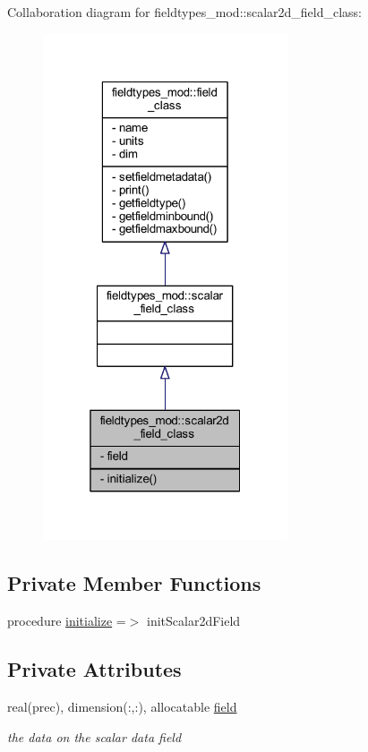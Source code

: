 Collaboration diagram for fieldtypes\+\_\+mod\+:\+:scalar2d\+\_\+field\+\_\+class\+:\nopagebreak
\begin{figure}[H]
\begin{center}
\leavevmode
\includegraphics[width=205pt]{structfieldtypes__mod_1_1scalar2d__field__class__coll__graph}
\end{center}
\end{figure}
\subsection*{Private Member Functions}
\begin{DoxyCompactItemize}
\item 
procedure \mbox{\hyperlink{structfieldtypes__mod_1_1scalar2d__field__class_ad351be43d28cb9fc0a7cbb8874315276}{initialize}} =$>$ init\+Scalar2d\+Field
\end{DoxyCompactItemize}
\subsection*{Private Attributes}
\begin{DoxyCompactItemize}
\item 
real(prec), dimension(\+:,\+:), allocatable \mbox{\hyperlink{structfieldtypes__mod_1_1scalar2d__field__class_a4c3879389ef1af4e218544a5acc3215d}{field}}
\begin{DoxyCompactList}\small\item\em the data on the scalar data field \end{DoxyCompactList}\end{DoxyCompactItemize}


